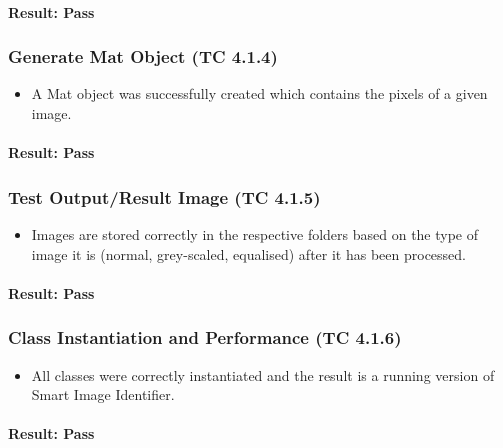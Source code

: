\documentclass[a4paper,12pt]{report}
\begin{document}
		\paragraph{Result: Pass}
		
		\subsubsection{Generate Mat Object (TC 4.1.4)}
		\begin {itemize}
			\item A Mat object was successfully created which contains the pixels of a given image.
		\end {itemize}
		\paragraph{Result: Pass}
		
		\subsubsection{Test Output/Result Image (TC 4.1.5)}
		\begin {itemize}
		\item Images are stored correctly in the respective folders based on the type of image it is (normal, grey-scaled, equalised) after it has been processed.
		\end {itemize}
		\paragraph{Result: Pass}
		
		\subsubsection{Class Instantiation and Performance (TC 4.1.6)}
		\begin {itemize}
		\item All classes were correctly instantiated and the result is a running version of Smart Image Identifier.
		\end {itemize}
		\paragraph{Result: Pass}
		
\end{document}
